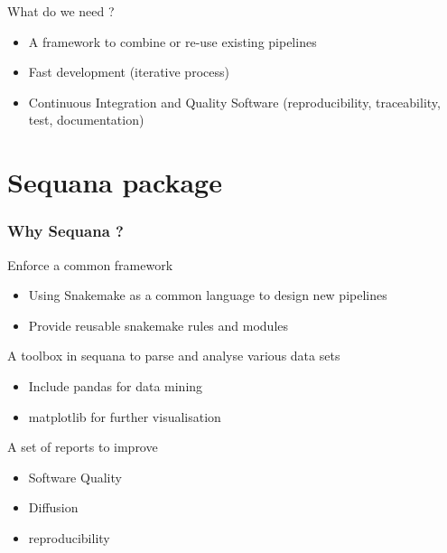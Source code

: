 \documentclass{beamer}
\begin{document}
\begin{frame}
    \begin{block}{What do we need ?}
    \begin{itemize}
     \item A framework to combine or re-use existing pipelines
     \item Fast development (iterative process)
     \item Continuous Integration and Quality Software (reproducibility, traceability, test, documentation)
    \end{itemize}
    \end{block}


 
\end{frame}
\section{Sequana package}


\begin{frame}
    \frametitle{Why Sequana ?}
    
    \begin{block}{Enforce a common framework}
    \begin{itemize}
        \item Using Snakemake as a common language to design new pipelines
        \item Provide reusable snakemake rules and modules
    \end{itemize} 
     \end{block}

    \begin{block}{A toolbox in sequana to parse and analyse various data sets }
    \begin{itemize}
        \item Include pandas for data mining
        \item matplotlib for further visualisation
    \end{itemize} 
    \end{block}

    \begin{block}{A set of reports to improve}
    \begin{itemize}
        \item Software Quality
        \item Diffusion
        \item reproducibility
    \end{itemize} 
    \end{block}
    
\end{frame}
\end{document}
